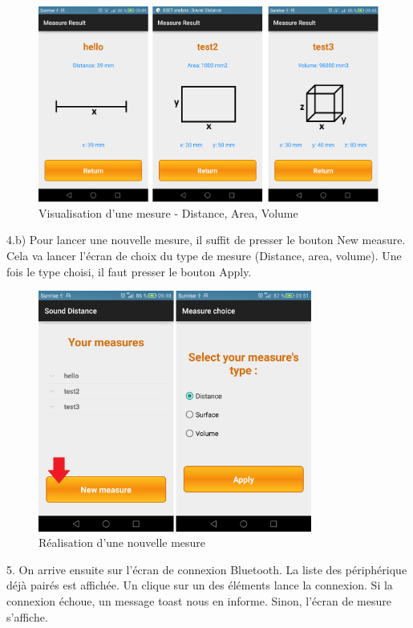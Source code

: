 \begin{enumerate}
\begin{figure}[H]
		\begin{center}
			\includegraphics[width=16cm]{img/viewMeas.png}
			\caption{Visualisation d'une mesure - Distance, Area, Volume}
			\label{view}
		\end{center}
	\end{figure}
\end{enumerate}
4.b) Pour lancer une nouvelle mesure, il suffit de presser le bouton New measure. Cela va lancer l'écran de choix du type de mesure (Distance, area, volume). Une fois le type choisi, il faut presser le bouton Apply.
\begin{figure}[H]
	\begin{center}
		\includegraphics[width=9cm]{img/newMeas.png}
		\caption{Réalisation d'une nouvelle mesure}
		\label{newMeas}
	\end{center}
\end{figure}
5. On arrive ensuite sur l'écran de connexion Bluetooth. La liste des périphérique déjà pairés est affichée. Un clique sur un des éléments lance la connexion. Si la connexion échoue, un message toast nous en informe. Sinon, l'écran de mesure s'affiche.
